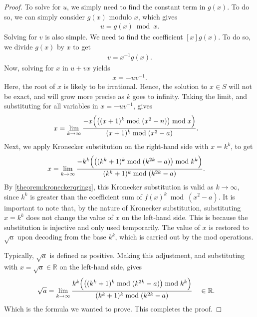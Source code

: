 \documentclass[12pt]{article}
\theoremstyle{plain}
\theoremstyle{definition}
\begin{document}
\begin{proof}
To solve for $u$, we simply need to find the constant term in $g(x)$. To do so, we can simply consider $g(x)$ modulo $x$, which gives
\begin{align*}
u = g(x) \bmod{x} .
\end{align*}
Solving for $v$ is also simple. We need to find the coefficient $[x] g(x)$. To do so, we divide $g(x)$ by $x$ to get
\begin{align*}
v = x^{-1} g(x) .
\end{align*}
Now, solving for $x$ in $u + v x$ yields
\begin{align*}
x = -u v^{-1} .
\end{align*}
Here, the root of $x$ is likely to be irrational. Hence, the solution to $x \in S$ will not be exact, and will grow more precise as $k$ goes to infinity. Taking the limit, and substituting for all variables in $x = -u v^{-1}$, gives
\begin{align*}
x &= \lim_{k\rightarrow\infty}
    \frac{-x \Bigl( \bigl( (x + 1)^k \bmod{(x^2-n)} \bigr) \bmod{x} \Bigr) }
        {(x + 1)^k \bmod{(x^2-a)}} .
\end{align*}
Next, we apply Kronecker substitution on the right-hand side with $x = k^k$, to get
\begin{align*}
x &= \lim_{k\rightarrow\infty}
    \frac{-k^k \Bigl( \bigl( (k^k + 1)^k \bmod{(k^{2k}-a)} \bigr) \bmod{k^k} \Bigr)}
        {(k^k + 1)^k \bmod{(k^{2k}-a)}} .
\end{align*}
By \cref{theorem:kroneckerqrings}, this Kronecker substitution is valid as $k\rightarrow\infty$, since $k^k$ is greater than the coefficient sum of $f(x)^k \bmod{(x^2-a)}$. It is important to note that, by the nature of Kronecker substitution, substituting $x=k^k$ does not change the value of $x$ on the left-hand side. This is because the substitution is injective and only used temporarily. The value of $x$ is restored to $\sqrt{a}$ upon decoding from the base $k^k$, which is carried out by the mod operations.

Typically, $\sqrt{a}$ is defined as positive. Making this adjustment, and substituting with $x = \sqrt{a} \in \mathbb{R}$ on the left-hand side, gives
\begin{align*}
\sqrt{a} &= \lim_{k\rightarrow\infty}
    \frac{k^k \Bigl( \bigl( (k^k + 1)^k \bmod{(k^{2k}-a)} \bigr) \bmod{k^k} \Bigr)}
        {(k^k + 1)^k \bmod{(k^{2k}-a)}}  \quad \in \mathbb{R} .
\end{align*}
Which is the formula we wanted to prove. This completes the proof.
\end{proof}
\end{document}

